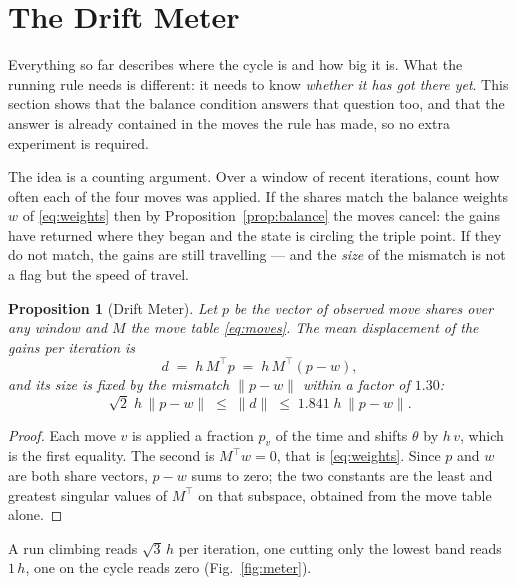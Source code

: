 \documentclass[letterpaper, 10pt, conference, twocolumn]{ieeeconf}
\newtheorem{proposition}{Proposition}
\begin{document}
\section{The Drift Meter}
\label{sec:detector}\label{sec:accel}

Everything so far describes where the cycle is and how big it is. What the
running rule needs is different: it needs to know \emph{whether it has got
there yet}. This section shows that the balance condition answers that
question too, and that the answer is already contained in the moves the rule
has made, so no extra experiment is required.

The idea is a counting argument. Over a window of recent iterations, count how
often each of the four moves was applied. If the shares match the balance
weights $w$ of \eqref{eq:weights} then by Proposition~\ref{prop:balance} the
moves cancel: the gains have returned where they began and the state is
circling the triple point. If they do not match, the gains are still
travelling --- and the \emph{size} of the mismatch is not a flag but the speed
of travel.

\begin{proposition}[Drift Meter]
\label{prop:meter}
Let $p$ be the vector of observed move shares over any window and $M$ the move
table \eqref{eq:moves}. The mean displacement of the gains per iteration is
\begin{equation}
d \;=\; h\,M^{\!\top} p \;=\; h\,M^{\!\top}(p - w),
\label{eq:meter}
\end{equation}
and its size is fixed by the mismatch $\lVert p-w\rVert$ within a factor
of $1.30$:
\begin{equation}
\sqrt{2}\;h\,\lVert p - w\rVert \;\le\; \lVert d \rVert \;\le\;
1.841\;h\,\lVert p - w\rVert .
\label{eq:meterbound}
\end{equation}
\end{proposition}

\begin{proof}
Each move $v$ is applied a fraction $p_v$ of the time and shifts $\theta$ by
$h\,v$, which is the first equality. The second is $M^{\!\top}w = 0$, that is
\eqref{eq:weights}. Since $p$ and $w$ are both share vectors, $p-w$ sums to
zero; the two constants are the least and greatest singular values of
$M^{\!\top}$ on that subspace, obtained from the move table alone.
\end{proof}

A run climbing reads $\sqrt3\,h$ per iteration, one cutting only the lowest
band reads $1\,h$, one on the cycle reads zero (Fig.~\ref{fig:meter}).
\end{document}
